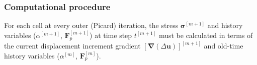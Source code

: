 \documentclass[sn-mathphys,Numbered,draft]{sn-jnl}%
\newcommand{\bb}{\boldsymbol}
\begin{document}
\subsubsection{Computational procedure}

For each cell at every outer (Picard) iteration, the stress $\bb{\sigma}^{[m+1]}$ and history variables ($\alpha^{[m+1]}$, $\bb{F}_p^{[m+1]}$) at time step $t^{[m+1]}$ must be calculated in terms of the current displacement increment gradient $[\bb{\nabla} (\Delta \bb{u})]^{[m+1]}$ and old-time history variables ($\alpha^{[m]}$, $\bb{F}_p^{[m]}$).

\end{document}

